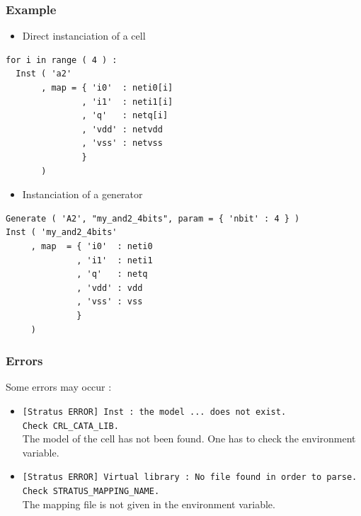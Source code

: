 \subsubsection{Example}

\begin{itemize}
    \item Direct instanciation of a cell
\end{itemize}
\begin{verbatim}
for i in range ( 4 ) :
  Inst ( 'a2'
       , map = { 'i0'  : neti0[i]
               , 'i1'  : neti1[i]
               , 'q'   : netq[i]
               , 'vdd' : netvdd
               , 'vss' : netvss
               }
       )
\end{verbatim}

\begin{itemize}
    \item Instanciation of a generator
\end{itemize}
\begin{verbatim}
Generate ( 'A2', "my_and2_4bits", param = { 'nbit' : 4 } )
Inst ( 'my_and2_4bits'
     , map  = { 'i0'  : neti0
              , 'i1'  : neti1
              , 'q'   : netq
              , 'vdd' : vdd
              , 'vss' : vss
              }
     )
\end{verbatim}

\subsubsection{Errors}
    
Some errors may occur :
\begin{itemize}
    \item \verb-[Stratus ERROR] Inst : the model ... does not exist.-\\\verb-Check CRL_CATA_LIB.-\\The model of the cell has not been found. One has to check the environment variable.
    \item \verb-[Stratus ERROR] Virtual library : No file found in order to parse.-\\\verb-Check STRATUS_MAPPING_NAME.-\\The mapping file is not given in the environment variable.
\end{itemize} 

\begin{htmlonly}

\end{htmlonly}
